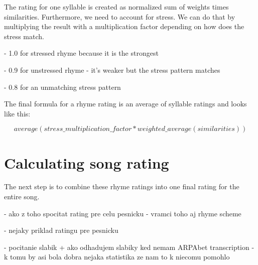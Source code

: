The rating for one syllable is created as normalized sum of weights times similarities. Furthermore, we need to account for stress. We can do that by multiplying the result with a multiplication factor depending on how does the stress match.

- 1.0 for stressed rhyme because it is the strongest

- 0.9 for unstressed rhyme - it's weaker but the stress pattern matches

- 0.8 for an unmatching stress pattern

The final formula for a rhyme rating is an average of syllable ratings and looks like this:

\[average(stress\_multiplication\_factor*weighted\_average(similarities))\]

\section{Calculating song rating}
The next step is to combine these rhyme ratings into one final rating for the entire song. 




- ako z toho spocitat rating pre celu pesnicku
	- vramci toho aj rhyme scheme
	
- nejaky priklad ratingu pre pesnicku

- pocitanie slabik + ako odhadujem slabiky ked nemam ARPAbet transcription
	- k tomu by asi bola dobra nejaka statistika ze nam to k niecomu pomohlo
	


